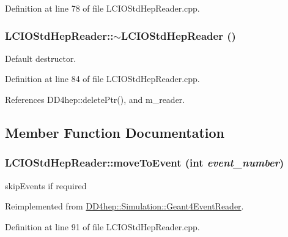 Definition at line 78 of file LCIOStdHepReader.cpp.\hypertarget{class_d_d4hep_1_1_simulation_1_1_l_c_i_o_std_hep_reader_a8435282d1017281ed60c84dee829859e}{
\subsubsection[{$\sim$LCIOStdHepReader}]{\setlength{\rightskip}{0pt plus 5cm}LCIOStdHepReader::$\sim$LCIOStdHepReader ()}}
\label{class_d_d4hep_1_1_simulation_1_1_l_c_i_o_std_hep_reader_a8435282d1017281ed60c84dee829859e}


Default destructor. 

Definition at line 84 of file LCIOStdHepReader.cpp.

References DD4hep::deletePtr(), and m\_\-reader.

\subsection{Member Function Documentation}
\hypertarget{class_d_d4hep_1_1_simulation_1_1_l_c_i_o_std_hep_reader_a5f91d2bbdab11ee4554abf164acf1e1e}{
\subsubsection[{moveToEvent}]{ LCIOStdHepReader::moveToEvent (int {\em event\_\-number})}}
\label{class_d_d4hep_1_1_simulation_1_1_l_c_i_o_std_hep_reader_a5f91d2bbdab11ee4554abf164acf1e1e}


skipEvents if required 

Reimplemented from \hyperlink{class_d_d4hep_1_1_simulation_1_1_geant4_event_reader_a0b6d2fe12ae259534cbe7a5b6e35b642}{DD4hep::Simulation::Geant4EventReader}.

Definition at line 91 of file LCIOStdHepReader.cpp.

